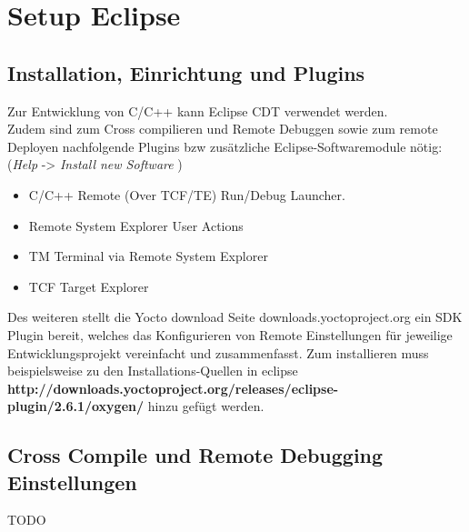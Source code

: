 \chapter{Setup Eclipse}%
\label{cha:setup_eclipse}

\section{Installation,  Einrichtung und Plugins}%
\label{sec:installation__einrichtung_plugins}

Zur Entwicklung von C/C++ kann Eclipse CDT verwendet werden. \\


Zudem sind zum Cross compilieren und Remote Debuggen sowie zum remote
Deployen nachfolgende Plugins bzw zusätzliche Eclipse-Softwaremodule nötig:
(\textit{Help} -> \textit{Install new Software} )

\begin{itemize}
    \item C/C++ Remote (Over TCF/TE) Run/Debug Launcher.
    \item Remote System Explorer User Actions
    \item TM Terminal via Remote System Explorer
    \item TCF Target Explorer
\end{itemize}

Des weiteren stellt die Yocto download Seite downloads.yoctoproject.org
ein SDK Plugin bereit, welches das Konfigurieren von Remote Einstellungen
für jeweilige Entwicklungsprojekt vereinfacht und zusammenfasst. Zum
installieren muss beispielsweise zu den Installations-Quellen in eclipse
\textbf{http://downloads.yoctoproject.org/releases/eclipse-plugin/2.6.1/oxygen/}
hinzu gefügt werden.


\section{Cross Compile und Remote Debugging Einstellungen}%
\label{sec:cross_compile_und_remote_debugging_einstellungen}

TODO
